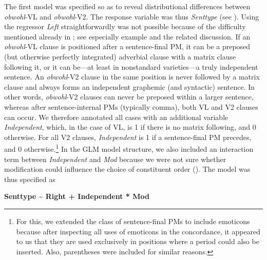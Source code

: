 \begin{styleMoutonText}
The first model was specified so as to reveal distributional differences between \textit{obwohl}{}-VL and \textit{obwohl}{}-V2. The response variable was thus \textit{Senttype} (see ). Using the regressor \textit{Left} straightforwardly was not possible because of the difficulty mentioned already in ; see especially example  and the related discussion. If an \textit{obwohl}{}-VL clause is positioned after a sentence-final PM, it can be a preposed (but otherwise perfectly integrated) adverbial clause with a matrix clause following it, or it can be—at least in nonstandard varieties—a truly independent sentence. An \textit{obwohl}{}-V2 clause in the same position is never followed by a matrix clause and always forms an independent graphemic (and syntactic) sentence. In other words, \textit{obwohl}{}-V2 clauses can never be preposed within a larger sentence, whereas after sentence-internal PMs (typically comma), both VL and V2 clauses can occur. We therefore annotated all cases with an additional variable \textit{Independent}, which, in the case of VL, is 1 if there is no matrix following, and 0 otherwise. For all V2 clauses, \textit{Independent} is 1 if a sentence-final PM precedes, and 0 otherwise.\footnote{For this, we extended the class of sentence-final PMs to include emoticons because after inspecting all uses of emoticons in the concordance, it appeared to us that they are used exclusively in positions where a period could also be inserted. Also, parentheses were included for similar reasons.} In the GLM model structure, we also included an interaction term between \textit{Independent} and \textit{Mod} because we were not sure whether modification could influence the choice of constituent order (). The model was thus specified as
\end{styleMoutonText}

\begin{styleMoutonText}\bfseries
Senttype {\textasciitilde} Right + Independent * Mod
\end{styleMoutonText}

